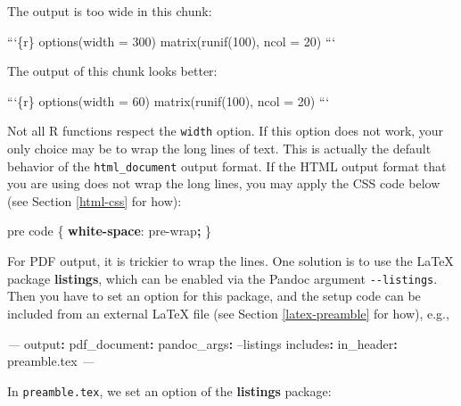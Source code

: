 \documentclass[
  11pt,
]{krantz}
\newenvironment{Shaded}{\begin{snugshade}}{\end{snugshade}}
\newcommand{\AttributeTok}[1]{\textcolor[rgb]{0.61,0.61,0.61}{#1}}
\newcommand{\BaseNTok}[1]{\textcolor[rgb]{0.06,0.06,0.06}{#1}}
\newcommand{\DecValTok}[1]{\textcolor[rgb]{0.06,0.06,0.06}{#1}}
\newcommand{\FunctionTok}[1]{\textcolor[rgb]{0,0,0}{#1}}
\newcommand{\KeywordTok}[1]{\textcolor[rgb]{0.27,0.27,0.27}{\textbf{#1}}}
\newcommand{\NormalTok}[1]{#1}
\newcommand{\OperatorTok}[1]{\textcolor[rgb]{0.43,0.43,0.43}{\textbf{#1}}}
\newcommand{\PreprocessorTok}[1]{\textcolor[rgb]{0.37,0.37,0.37}{\textit{#1}}}
\begin{document}
\begin{Shaded}
\begin{Highlighting}[]
\NormalTok{The output is too wide in this chunk:}

\BaseNTok{```\{r\}}
\BaseNTok{options(width = 300)}
\BaseNTok{matrix(runif(100), ncol = 20)}
\BaseNTok{```}

\NormalTok{The output of this chunk looks better:}

\BaseNTok{```\{r\}}
\BaseNTok{options(width = 60)}
\BaseNTok{matrix(runif(100), ncol = 20)}
\BaseNTok{```}
\end{Highlighting}
\end{Shaded}

Not all R functions respect the \texttt{width} option. If this option does not work, your only choice may be to wrap the long lines of text. This is actually the default behavior of the \texttt{html\_document} output format. If the HTML output format that you are using does not wrap the long lines, you may apply the CSS code below (see Section \ref{html-css} for how):

\begin{Shaded}
\begin{Highlighting}[]
\NormalTok{pre code \{}
  \KeywordTok{white-space}\NormalTok{: }\DecValTok{pre-wrap}\OperatorTok{;}
\NormalTok{\}}
\end{Highlighting}
\end{Shaded}

For PDF output, it is trickier to wrap the lines. One solution is to use the LaTeX package \textbf{listings}, which can be enabled via the Pandoc argument \texttt{-\/-listings}. Then you have to set an option for this package, and the setup code can be included from an external LaTeX file (see Section \ref{latex-preamble} for how), e.g.,

\begin{Shaded}
\begin{Highlighting}[]
\PreprocessorTok{---}
\FunctionTok{output}\KeywordTok{:}
\AttributeTok{  }\FunctionTok{pdf_document}\KeywordTok{:}
\AttributeTok{    }\FunctionTok{pandoc_args}\KeywordTok{:}\AttributeTok{ --listings}
\AttributeTok{    }\FunctionTok{includes}\KeywordTok{:}
\AttributeTok{      }\FunctionTok{in_header}\KeywordTok{:}\AttributeTok{ preamble.tex}
\PreprocessorTok{---}
\end{Highlighting}
\end{Shaded}

In \texttt{preamble.tex}, we set an option of the \textbf{listings} package:
\end{document}
